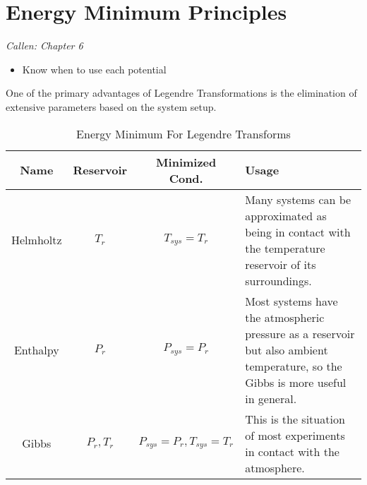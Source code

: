
\section{Energy Minimum Principles}

\emph{Callen: Chapter 6}
\begin{itemize}
    \item Know when to use each potential
\end{itemize}
One of the primary advantages of Legendre Transformations is the elimination of extensive parameters based on the system setup.

\begin{table}[!htbp]
    \caption{Energy Minimum For Legendre Transforms}
    \centering
        \begin{tabular}{c|c c p{5cm}}
            \toprule
            Name       & Reservoir & Minimized Cond. & Usage  \\
            \midrule
            Helmholtz  & $T_r$       & $T_{sys} = T_r$   & Many systems can be approximated as being in contact with the temperature reservoir of its surroundings. \\
            \midrule
            Enthalpy   & $P_r$       & $P_{sys} = P_r$   & Most systems have the atmospheric pressure as a reservoir but also ambient temperature, so the Gibbs is more useful in general. \\
            \midrule
            Gibbs      & $P_r,T_r$   & $P_{sys} = P_r, T_{sys} = T_r$  & This is the situation of most experiments in contact with the atmosphere.
    \end{tabular}
    \label{tab:minimum}
\end{table}